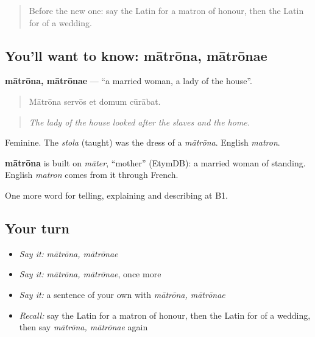 \label{lesson:LA-C328-matrona}



\begin{quote}
Before the new one: say the Latin for a matron of honour, then the Latin for of a wedding.
\end{quote}

\subsection*{You'll want to know: mātrōna, mātrōnae}
\textbf{mātrōna, mātrōnae} — \textquotedblleft{}a married woman, a lady of the house\textquotedblright{}.

\begin{quote}
Mātrōna servōs et domum cūrābat.
\end{quote}

\begin{quote}
\emph{The lady of the house looked after the slaves and the home.}
\end{quote}

Feminine. The \emph{stola} (taught) was the dress of a \emph{mātrōna}. English \emph{matron}.

\begin{cousinweb}
\textbf{mātrōna} is built on \emph{māter}, \textquotedblleft{}mother\textquotedblright{} (EtymDB): a married woman of standing. English \emph{matron} comes from it through French.
\end{cousinweb}

\begin{grammarlens}[title={What you've built}]
One more word for telling, explaining and describing at B1.
\end{grammarlens}

\subsection*{Your turn}
\begin{itemize}
\raggedright
  \item \emph{Say it:} \emph{mātrōna, mātrōnae}
  \item \emph{Say it:} \emph{mātrōna, mātrōnae}, once more
  \item \emph{Say it:} a sentence of your own with \emph{mātrōna, mātrōnae}
  \item \emph{Recall:} say the Latin for a matron of honour, then the Latin for of a wedding, then say \emph{mātrōna, mātrōnae} again
\end{itemize}

